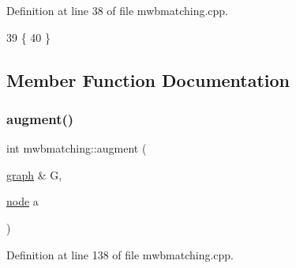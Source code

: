 Definition at line 38 of file mwbmatching.\+cpp.


\begin{DoxyCode}
39 \{
40 \}
\end{DoxyCode}


\subsection{Member Function Documentation}
\mbox{\label{classmwbmatching_adfb6ea829377c6ba08f6079d767d5a42}} 
\subsubsection{\texorpdfstring{augment()}{augment()}}
{\footnotesize\ttfamily int mwbmatching\+::augment (\begin{DoxyParamCaption}\item[{\mbox{\hyperlink{classgraph}{graph}} \&}]{G,  }\item[{\mbox{\hyperlink{classnode}{node}}}]{a }\end{DoxyParamCaption})\hspace{0.3cm}{\ttfamily [protected]}}



Definition at line 138 of file mwbmatching.\+cpp.


